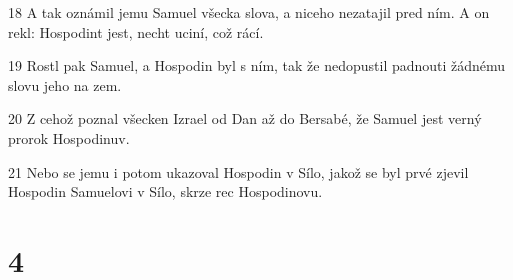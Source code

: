 \par 18 A tak oznámil jemu Samuel všecka slova, a niceho nezatajil pred ním. A on rekl: Hospodint jest, necht uciní, což rácí.
\par 19 Rostl pak Samuel, a Hospodin byl s ním, tak že nedopustil padnouti žádnému slovu jeho na zem.
\par 20 Z cehož poznal všecken Izrael od Dan až do Bersabé, že Samuel jest verný prorok Hospodinuv.
\par 21 Nebo se jemu i potom ukazoval Hospodin v Sílo, jakož se byl prvé zjevil Hospodin Samuelovi v Sílo, skrze rec Hospodinovu.

\chapter{4}

